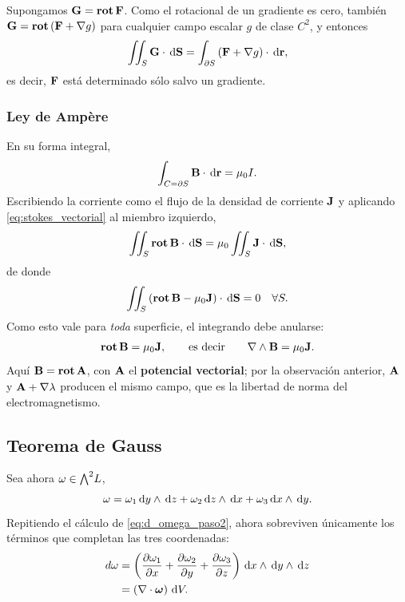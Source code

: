 \begin{observacion}
  Supongamos $\mathbf{G}=\operatorname{\mathbf{rot}}\mathbf{F}$. Como el rotacional de un gradiente es cero,
  tambi\'en $\mathbf{G}=\operatorname{\mathbf{rot}}\left( \mathbf{F}+\nabla g \right)$ para cualquier campo escalar
  $g$ de clase $C^2$, y entonces
  \begin{equation}
    \label{eq:invariancia_norma}
    \iint_{S}\mathbf{G}\cdot\,\mathrm{d}\mathbf{S}
      =\int_{\partial S}\left( \mathbf{F}+\nabla g \right)\cdot\,\mathrm{d}\mathbf{r},
  \end{equation}
  es decir, $\mathbf{F}$ est\'a determinado s\'olo salvo un gradiente.
\end{observacion}

\subsubsection{Ley de Amp\`ere}
\label{subsubsec:ampere}

En su forma integral,
\begin{equation}
  \label{eq:ampere_integral}
  \int_{C=\partial S}\mathbf{B}\cdot\,\mathrm{d}\mathbf{r}=\mu_0 I .
\end{equation}
Escribiendo la corriente como el flujo de la densidad de corriente
$\mathbf{J}$ y aplicando \eqref{eq:stokes_vectorial} al miembro izquierdo,
\begin{equation}
  \label{eq:ampere_paso}
  \iint_{S}\operatorname{\mathbf{rot}}\mathbf{B}\cdot\,\mathrm{d}\mathbf{S}
    =\mu_0\iint_{S}\mathbf{J}\cdot\,\mathrm{d}\mathbf{S},
\end{equation}
de donde
\begin{equation}
  \label{eq:ampere_diferencial}
  \iint_{S}\left( \operatorname{\mathbf{rot}}\mathbf{B}-\mu_0\mathbf{J} \right)\cdot\,\mathrm{d}\mathbf{S}=0
  \quad\forall S .
\end{equation}
Como esto vale para \emph{toda} superficie, el integrando debe anularse:
\begin{equation}
  \label{eq:ampere_local}
  \operatorname{\mathbf{rot}}\mathbf{B}=\mu_0\mathbf{J},
  \qquad\text{es decir}\qquad
  \nabla\wedge\mathbf{B}=\mu_0\mathbf{J} .
\end{equation}
Aqu\'i $\mathbf{B}=\operatorname{\mathbf{rot}}\mathbf{A}$, con $\mathbf{A}$ el \textbf{potencial vectorial};
por la observaci\'on anterior, $\mathbf{A}$ y $\mathbf{A}+\nabla\lambda$ producen el mismo
campo, que es la libertad de norma del electromagnetismo.

\subsection{Teorema de Gauss}
\label{subsec:gauss}

Sea ahora $\omega\in\textstyle\bigwedge^{2}\!L$,
\begin{equation}
  \label{eq:dos_forma}
  \omega=\omega_1\,\mathrm{d} y\wedge\,\mathrm{d} z+\omega_2\,\mathrm{d} z\wedge\,\mathrm{d} x
    +\omega_3\,\mathrm{d} x\wedge\,\mathrm{d} y .
\end{equation}
Repitiendo el c\'alculo de \eqref{eq:d_omega_paso2}, ahora sobreviven
\'unicamente los t\'erminos que completan las tres coordenadas:
\begin{equation}
  \label{eq:d_omega_div}
  \begin{aligned}
    d\omega&=\left( \frac{\partial \omega_1}{\partial x}+\frac{\partial \omega_2}{\partial y}+\frac{\partial \omega_3}{\partial z} \right)
          \,\mathrm{d} x\wedge\,\mathrm{d} y\wedge\,\mathrm{d} z\\
        &=\left( \nabla\cdot\boldsymbol{\omega} \right)\,\mathrm{d} V .
  \end{aligned}
\end{equation}

